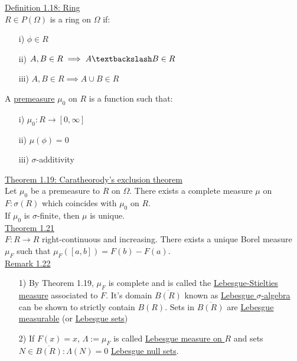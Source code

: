 \documentclass[10pt,letterpaper]{article}
\begin{document}
\underline{Definition 1.18: Ring}\\

$R\in P(\Omega)$ is a ring on $\Omega$ if:

\begin{enumerate}
\item[i)] $\phi\in R$
\item[ii)] $A,B\in R\implies A\textbackslash B\in R$
\item[iii)] $A,B\in R\implies A\cup B\in R$
\end{enumerate}

A \underline{premeasure} $\mu_0$ on $R$ is a function such that:

\begin{enumerate}
\item[i)] $\mu_0: R\rightarrow [0,\infty]$
\item[ii)] $\mu(\phi) = 0$
\item[iii)] $\sigma$-additivity
\end{enumerate}

\underline{Theorem 1.19: Caratheorody's exclusion theorem}\\

Let $\mu_0$ be a premeasure to $R$ on $\Omega$. There exists a complete measure $\mu$ on $F:\sigma(R)$
which coincides with $\mu_0$ on $R$.\\

If $\mu_0$ is $\sigma$-finite, then $\mu$ is unique.\\

\underline{Theorem 1.21}\\

$F:R\rightarrow R$ right-continuous and increasing. There exists a unique Borel measure $\mu_F$
such that $\mu_F([a,b])=F(b)-F(a)$.\\

\underline{Remark 1.22}\\

\begin{enumerate}
\item[1)] By Theorem 1.19, $\mu_F$ is complete and is called the 
\underline{Lebesgue-Stielties measure} associated to $F$. It's domain $\overline{B(R)}$ known as
\underline{Lebesgue $\sigma$-algebra} can be shown to strictly contain $B(R)$. Sets in 
$\overline{B(R)}$ are \underline{Lebesgue measurable} (or \underline{Lebesgue sets})
\item[2)] If $F(x) = x$, $\Lambda :=\mu_F$ is called \underline{Lebesgue measure on $R$}
and sets $N\in \overline{B(R)}: \Lambda(N)=0$ \underline{Lebesgue null sets}.
\end{enumerate}
\end{document}
